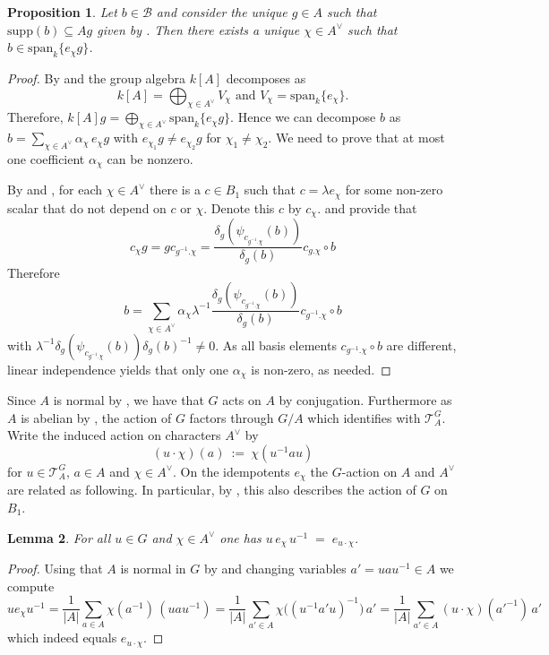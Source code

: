 \documentclass[a4paper,10pt]{amsart}
\newtheorem{lemma}{Lemma}[section]
\newtheorem{proposition}[lemma]{Proposition}
\theoremstyle{definition}
\theoremstyle{remark}
\newcommand{\Supp}{\mathrm{supp}}
\newcommand{\Span}{\mathrm{span}}
\newcommand\mc{\mathcal}
\begin{document}
\begin{proposition}\label{lem:purity-single-line}
Let $b \in \mc{B}$ and consider the unique $g \in A$ such that $\Supp(b) \subseteq Ag$ given by . Then there exists a unique $\chi\in A^\vee$ such that $b\in \Span_k\{ e_\chi g\}$.
\end{proposition}
\begin{proof}
By  and  the group algebra $k[A]$ decomposes as 
$$k[A] = \bigoplus_{\chi \in A^{\vee}} V_{\chi} \text{ and } V_{\chi} = \Span_k\{ e_{\chi}\}.$$
Therefore, $k[A]g = \bigoplus_{\chi\in A^\vee} \Span_k\{ e_\chi g\}$. Hence we can decompose $b$ as $ b=\sum_{\chi \in A^{\vee}}\alpha_\chi \,e_\chi g$ with $e_{\chi_1}g \neq e_{\chi_2}g$ for $\chi_1 \neq \chi_2.$
We need to prove that at most one coefficient $\alpha_\chi$ can be nonzero. 

By  and , for each $\chi \in A^{\vee}$ there is a $c \in B_1$ such that $c = \lambda e_{\chi}$ for some non-zero scalar that do not depend on $c$ or $\chi$. Denote this $c$ by $c_{\chi}$.  and  provide that
$$c_{\chi}g = g c_{g^{-1}.\chi} =\frac{\delta_g(\psi_{c_{g^{-1}.\chi}}(b))}{\delta_g(b)} c_{g.\chi}\circ b$$
Therefore 
$$b =\sum_{\chi \in A^{\vee}} \alpha_{\chi}\lambda^{-1} \frac{\delta_g(\psi_{c_{g^{-1}.\chi}}(b))}{\delta_g(b)} c_{g^{-1}.\chi}\circ b$$
with $\lambda^{-1} \delta_g(\psi_{c_{g^{-1}.\chi}}(b))\delta_g(b)^{-1} \neq 0$.
As all basis elements $c_{g^{-1}.\chi} \circ b$ are different, linear independence yields that only one $\alpha_{\chi}$ is non-zero, as needed. 

\end{proof}

Since $A$ is normal by , we have that $G$ acts on $A$ by conjugation. Furthermore as $A$ is abelian by , the action of $G$ factors through $G/A$ which identifies with $\mc{T}_A^G$. Write the induced action on characters $A^{\vee}$ by
$$
(u\cdot\chi)(a)\ :=\ \chi(u^{-1}au)
$$
for $u\in \mc{T}_A^G, \, a \in A$ and $\chi \in A^{\vee}$. On the idempotents $e_{\chi}$ the $G$-action on $A$ and $A^{\vee}$ are related as following. In particular, by , this also describes the action of $G$ on $B_1$.

\begin{lemma}\label{lem:conj-idem}
For all $u \in G$ and $\chi \in A^{\vee}$ one has $u\,e_\chi\,u^{-1} \;=\; e_{u\cdot\chi}$.
\end{lemma}
\begin{proof}
Using that $A$ is normal in $G$ by  and changing variables $a'=uau^{-1}\in A$ we compute
$$
u e_{\chi} u^{-1}
=\frac1{|A|}\sum_{a\in A}\chi(a^{-1})\, (uau^{-1})
=\frac1{|A|}\sum_{a'\in A}\chi\!\bigl((u^{-1}a'u)^{-1}\bigr)\, a'
=\frac1{|A|}\sum_{a'\in A}(u\cdot\chi)(a'^{-1})\,a'
$$
which indeed equals $e_{u\cdot\chi}.$
\end{proof}
\end{document}
